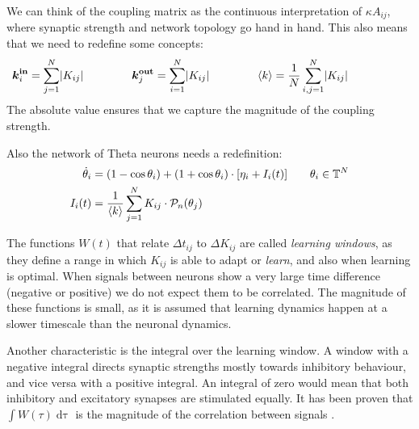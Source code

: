 We can think of the coupling matrix as the continuous interpretation of $\kappa A_{ij}$, where synaptic strength and network topology go hand in hand. This also means that we need to redefine some concepts:
\begin{align}
\kinbi = \sum_{j=1}^{N} \rvert K_{i j} \rvert \hspace{15mm} 
\koutbj = \sum_{i=1}^{N} \rvert K_{i j} \rvert \hspace{15mm} 
\kmean &= \frac{1}{N} \sum_{i,j=1}^{N} \rvert K_{i j} \rvert \hspace{15mm}  \label{eq:redefineFromK}  %
\end{align}
The absolute value ensures that we capture the magnitude of the coupling strength. %

Also the network of Theta neurons needs a redefinition:
\begin{align}
\dot{\theta}_{i} &=\left(1-\cos \theta_{i}\right)+\left(1+\cos \theta_{i}\right) \cdot \left[\eta_{i} + I_{i}(t)\right] \qquad \theta_i \in \T^N  \label{eq:thetaneuronnetwork_adaptive} \\
I_{i}(t) &=\frac{1}{\kmean} \sum_{j=1}^{N} K_{i j} \cdot \mathcal{P}_{n}(\theta_{j}) \label{eq:thetaneuronnetworkcurrent_adaptive}
\end{align}


The functions $W(t)$ that relate $\Delta t_{ij}$ to $\Delta K_{ij}$ are called \textsl{learning windows},  as they define a range in which $K_{ij}$ is able to adapt or \textsl{learn}, and also when learning is optimal. When signals between neurons show a very large time difference (negative or positive) we do not expect them to be correlated. %
The magnitude of these functions is small, as it is assumed that learning dynamics happen at a slower timescale than the neuronal dynamics.

Another characteristic is the integral over the learning window. A window with a negative integral directs synaptic strengths mostly towards inhibitory behaviour, and vice versa with a positive integral. An integral of zero would mean that both inhibitory and excitatory synapses are stimulated equally. It has been proven that $\int W(\tau) \mathop{d\tau}$ is the magnitude of the correlation between signals \cite{Gerstner2002}. \\


